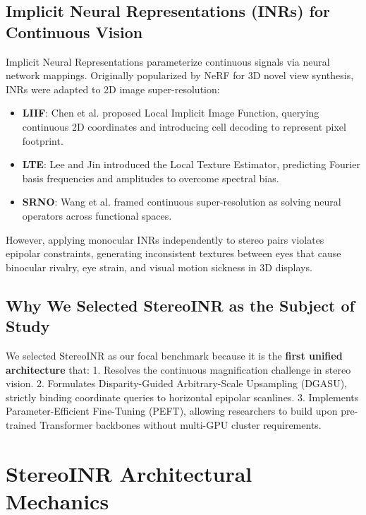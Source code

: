 \documentclass[10pt,journal,compsoc]{IEEEtran}
\begin{document}
\subsection{Implicit Neural Representations (INRs) for Continuous Vision}
Implicit Neural Representations parameterize continuous signals via neural network mappings. Originally popularized by NeRF \cite{mildenhall2021nerf} for 3D novel view synthesis, INRs were adapted to 2D image super-resolution:
\begin{itemize}
    \item \textbf{LIIF}: Chen et al. \cite{chen2021learning} proposed Local Implicit Image Function, querying continuous 2D coordinates and introducing cell decoding to represent pixel footprint.
    \item \textbf{LTE}: Lee and Jin \cite{lee2022local} introduced the Local Texture Estimator, predicting Fourier basis frequencies and amplitudes to overcome spectral bias.
    \item \textbf{SRNO}: Wang et al. \cite{wang2023neural} framed continuous super-resolution as solving neural operators across functional spaces.
\end{itemize}
However, applying monocular INRs independently to stereo pairs violates epipolar constraints, generating inconsistent textures between eyes that cause binocular rivalry, eye strain, and visual motion sickness in 3D displays.

\subsection{Why We Selected StereoINR as the Subject of Study}
We selected StereoINR as our focal benchmark because it is the \textbf{first unified architecture} that:
1. Resolves the continuous magnification challenge in stereo vision.
2. Formulates Disparity-Guided Arbitrary-Scale Upsampling (DGASU), strictly binding coordinate queries to horizontal epipolar scanlines.
3. Implements Parameter-Efficient Fine-Tuning (PEFT), allowing researchers to build upon pre-trained Transformer backbones without multi-GPU cluster requirements.

\section{StereoINR Architectural Mechanics}
\end{document}
